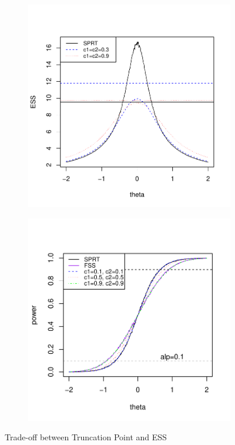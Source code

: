 \documentclass[11pt]{article}
\begin{document}
\begin{figure}
\centering
\begin{subfigure}{0.49\textwidth}
    \includegraphics[width=\textwidth]{images/trade-off.pdf}
\end{subfigure}
\hfill
\begin{subfigure}{0.49\textwidth}
    \includegraphics[width=\textwidth]{images/PowerFunction.pdf}
\end{subfigure}
\caption{Trade-off between Truncation Point and ESS}
\label{fig:trade-off}
\end{figure}
\end{document}
